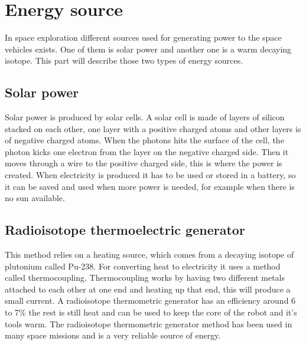 \section{Energy source}

In space exploration different sources used for generating power to the space vehicles exists. One of them is solar power and another one is a warm decaying isotope. \newline This part will describe those two types of energy sources.

\subsection{Solar power}
Solar power is produced by solar cells. A solar cell is made of layers of silicon stacked on each other, one layer with a positive charged atoms and other layers is of negative charged atoms.  When the photons hits the surface of the cell, the photon kicks one electron from the layer on the negative charged side. Then it moves through a wire to the positive charged side, this is where the power is created. When electricity is produced it has to be used or stored in a battery, so it can be saved and used when more power is needed, for example when there is no sun available.

\subsection{Radioisotope thermoelectric generator}
This method relies on a heating source, which comes from a decaying isotope of plutonium called Pu-238. For converting heat to electricity it uses a method called thermocoupling. Thermocoupling works by having two different metals attached to each other at one end and heating up that end, this will produce a small current.
A radioisotope thermometric generator has an efficiency around 6 to 7\% the rest is still heat and can be used to keep the core of the robot and it's tools warm. The radioisotope thermometric generator method has been used in many space missions and is a very reliable source of energy\cite{RTG}.


